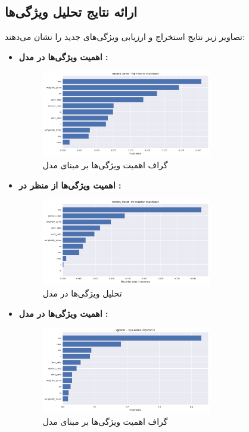 \subsection{ارائه نتایج تحلیل ویژگی‌ها} تصاویر زیر نتایج استخراج و ارزیابی ویژگی‌های جدید را نشان می‌دهند:
\begin{itemize}
    \item \textbf{اهمیت ویژگی‌ها در مدل :}
    \begin{figure}[ht]
        \centering
        \includegraphics[width=0.7\textwidth]{images/random_forest_feature_importance.png}
        \caption{گراف اهمیت ویژگی‌ها بر مبنای مدل }
    \end{figure}

    \item \textbf{اهمیت ویژگی‌ها از منظر  در :}
    \begin{figure}[ht]
        \centering
        \includegraphics[width=0.7\textwidth]{images/random_forest_permutation_importance.png}
        \caption{تحلیل  ویژگی‌ها در مدل }
    \end{figure}

    \item \textbf{اهمیت ویژگی‌ها در مدل :}
    \begin{figure}[ht]
        \centering
        \includegraphics[width=0.7\textwidth]{images/xgboost_feature_importance.png}
        \caption{گراف اهمیت ویژگی‌ها بر مبنای مدل }
    \end{figure}


\end{itemize}
